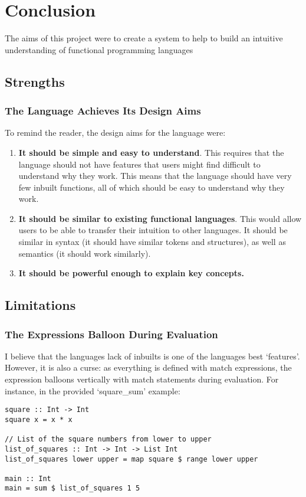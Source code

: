 \chapter{Conclusion}
\label{chap:conclusion}
The aims of this project were to create a system to help to build an intuitive understanding of functional programming languages

\section{Strengths}
\subsection{The Language Achieves Its Design Aims}
To remind the reader, the design aims for the language were:

\begin{enumerate}
    \item \textbf{It should be simple and easy to understand}. This requires that the language should not have features that users might find difficult to understand why they work. This means that the language should have very few inbuilt functions, all of which should be easy to understand why they work. 
    \item \textbf{It should be similar to existing functional languages}. This would allow users to be able to transfer their intuition to other languages. It should be similar in syntax (it should have similar tokens and structures), as well as semantics (it should work similarly). 
    \item \textbf{It should be powerful enough to explain key concepts.}
\end{enumerate}



\section{Limitations}
\subsection{The Expressions Balloon During Evaluation}
I believe that the languages lack of inbuilts is one of the languages best `features'. However, it is also a curse: as everything is defined with match expressions, the expression balloons vertically with match statements during evaluation. For instance, in the provided `square\_sum' example:

\begin{lstlisting}[language=SFL]
square :: Int -> Int
square x = x * x

// List of the square numbers from lower to upper
list_of_squares :: Int -> Int -> List Int
list_of_squares lower upper = map square $ range lower upper

main :: Int
main = sum $ list_of_squares 1 5
\end{lstlisting}

